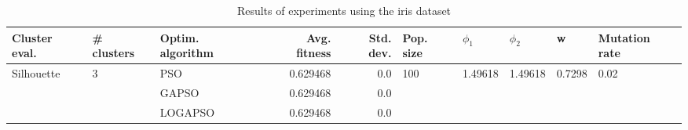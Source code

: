 \begin{table}
\centering
\caption{Results of experiments using the iris dataset}
\begin{tabular}{lllrrlllll}
\toprule
              Cluster eval. &        \# clusters & Optim. algorithm &  Avg. fitness &  Std. dev. &            Pop. size &               $\phi_{1}$ &               $\phi_{2}$ &                       w &         Mutation rate \\
\midrule
\multirow{3}{*}{Silhouette} & \multirow{3}{*}{3} &              PSO &      0.629468 &        0.0 & \multirow{3}{*}{100} & \multirow{3}{*}{1.49618} & \multirow{3}{*}{1.49618} & \multirow{3}{*}{0.7298} & \multirow{3}{*}{0.02} \\
                            &                    &            GAPSO &      0.629468 &        0.0 &                      &                          &                          &                         &                       \\
                            &                    &          LOGAPSO &      0.629468 &        0.0 &                      &                          &                          &                         &                       \\
\bottomrule
\end{tabular}
\end{table}
